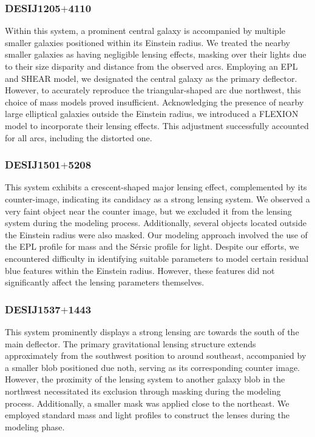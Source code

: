 \documentclass{aa}
\begin{document}
\subsubsection{DESIJ1205$+$4110}
\newcommand{\suggestion}[1]{\textcolor{blue}{#1}}

Within this system, a prominent central galaxy is accompanied by multiple smaller galaxies positioned within its Einstein radius. We treated the nearby smaller galaxies as having negligible lensing effects, masking over their lights due to their size disparity and distance from the observed arcs. Employing an EPL and SHEAR model, we designated the central galaxy as the primary deflector. However, to accurately reproduce the triangular-shaped arc due northwest, this choice of mass models proved insufficient. Acknowledging the presence of nearby large elliptical galaxies outside the Einstein radius, we introduced a FLEXION model to incorporate their lensing effects. This adjustment successfully accounted for all arcs, including the distorted one.


\subsubsection{DESIJ1501$+$5208}

This system exhibits a crescent-shaped major lensing effect, complemented by its counter-image, indicating its candidacy as a strong lensing system. We observed a very faint object near the counter image, but we excluded it from the lensing system during the modeling process. Additionally, several objects located outside the Einstein radius were also masked. Our modeling approach involved the use of the EPL profile for mass and the S\'ersic  profile for light. Despite our efforts, we encountered difficulty in identifying suitable parameters to model certain residual blue features within the Einstein radius. However, these features did not significantly affect the lensing parameters themselves.

\subsubsection{DESIJ1537$+$1443}

This system prominently displays a strong lensing arc towards the south of the main deflector. The primary gravitational lensing structure extends approximately from the southwest position to around southeast, accompanied by a smaller blob positioned due noth, serving as its corresponding counter image. However, the proximity of the lensing system to another galaxy blob in the northwest necessitated its exclusion through masking during the modeling process. Additionally, a smaller mask was applied close to the northeast. We employed standard mass and light profiles to construct the lenses during the modeling phase.
\end{document}
